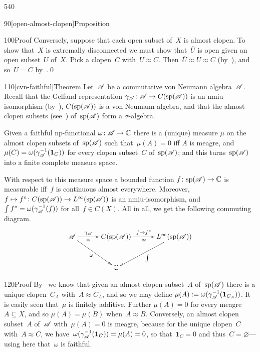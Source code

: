 \begin{parsec}{540}
\begin{point}{90}[open-almost-clopen]{Proposition}
\begin{point}{100}{Proof}
Conversely,
suppose that each open subset of~$X$ is almost clopen.
To show that~$X$ is extremally disconnected
we must show that~$\overline{U}$ is open given
an open subset~$U$ of~$X$.
Pick a clopen~$C$ with~$U\approx C$.
Then~$\overline{U}\approx U\approx C$
(by~),
and so~$\overline{U}=C$ by~.\qed
\end{point}
\end{point}
\begin{point}{110}[cvn-faithful]{Theorem}%
Let~$\mathscr{A}$ be a commutative von Neumann algebra~$\mathscr{A}$.
Recall that
the Gelfand representation $\gamma_{\mathscr{A}}\colon 
\mathscr{A}\to C(\mathrm{sp}(\mathscr{A}))$
is an nmiu-isomorphism (by~),
$C(\mathrm{sp}(\mathscr{A}))$ is a von Neumann algebra,
and that the almost clopen subsets (see~) of~$\mathrm{sp}(\mathscr{A})$
form a $\sigma$-algebra.

Given a faithful np-functional $\omega\colon \mathscr{A}\to\mathbb{C}$
there is a (unique) measure
$\mu$ on the almost clopen subsets of~$\mathrm{sp}(\mathscr{A})$
such that~$\mu(A)=0$ iff $A$ is meagre,
and~$\mu(C)=\omega(\gamma_{\mathscr{A}}^{-1} (\mathbf{1}_{C}))$
for every clopen subset~$C$ of~$\mathrm{sp}(\mathscr{A})$;
and this turns~$\mathrm{sp}(\mathscr{A})$
into a finite complete measure space.

With respect to this measure space a
bounded function $f\colon \mathrm{sp}(\mathscr{A})\to\mathbb{C}$
is measurable iff~$f$ is continuous almost everywhere.
Moreover, 
$f\mapsto f^\circ\colon C(\mathrm{sp}(\mathscr{A}))\to L^\infty(\mathrm{sp}(\mathscr{A}))$
is an nmiu-isomorphism,
and~$\int f^\circ = \omega(\gamma_{\mathscr{A}}^{-1}(f))$ for all~$f\in C(X)$.
All in all,
we get the following commuting diagram.
\begin{equation*}
\xymatrix@C=3em@R=3em{
\scrA
\ar[r]^-{\gamma_\scrA}_-\cong
\ar[rd]_\omega
&
C(\spec(\scrA))
\ar[r]^-{f\mapsto f^\circ}_-\cong
&
L^\infty(\spec(\scrA))
\ar[ld]^\int
\\
&
\C
}
\end{equation*}
\begin{point}{120}{Proof}%
By~
we know that given an almost clopen subset~$A$
of~$\mathrm{sp}(\mathscr{A})$
there is a unique clopen~$C_A$
with~$A\approx C_A$,
and 
so we may define
$\mu(A):=\omega(\gamma_{\mathscr{A}}^{-1}(\mathbf{1}_{C_A}))$.
It is easily seen that~$\mu$
is finitely additive.
Further $\mu(A)=0$ for every meagre~$A\subseteq X$,
and so $\mu(A)=\mu(B)$ when~$A\approx B$.
Conversely, 
an almost clopen subset~$A$
of~$\mathscr{A}$
with~$\mu(A)=0$
is meagre,
because for the unique clopen~$C$ with~$A\approx C$,
we have~$\omega(\gamma_{\mathscr{A}}^{-1}(\mathbf{1}_C))=\mu(A)=0$,
so that~$\mathbf{1}_C=0$ and thus~$C=\varnothing$---using here
that~$\omega$ is faithful.


\end{point}
\end{point}
\end{parsec}
